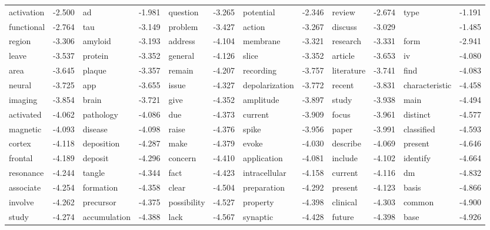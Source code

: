 \documentclass{article}
\begin{document}
\begin{table}
{\begin{tabular}{|l r|l r|l r|l r|l r|l r|}
\hline
activation & -2.500 & ad & -1.981 & question & -3.265 & potential & -2.346 & review & -2.674 & type & -1.191\\
functional & -2.764 & tau & -3.149 & problem & -3.427 & action & -3.267 & discuss & -3.029 &  & -1.485\\
region & -3.306 & amyloid & -3.193 & address & -4.104 & membrane & -3.321 & research & -3.331 & form & -2.941\\
leave & -3.537 & protein & -3.352 & general & -4.126 & slice & -3.352 & article & -3.653 & iv & -4.080\\
area & -3.645 & plaque & -3.357 & remain & -4.207 & recording & -3.757 & literature & -3.741 & find & -4.083\\
neural & -3.725 & app & -3.655 & issue & -4.327 & depolarization & -3.772 & recent & -3.831 & characteristic & -4.458\\
imaging & -3.854 & brain & -3.721 & give & -4.352 & amplitude & -3.897 & study & -3.938 & main & -4.494\\
activated & -4.062 & pathology & -4.086 & due & -4.373 & current & -3.909 & focus & -3.961 & distinct & -4.577\\
magnetic & -4.093 & disease & -4.098 & raise & -4.376 & spike & -3.956 & paper & -3.991 & classified & -4.593\\
cortex & -4.118 & deposition & -4.287 & make & -4.379 & evoke & -4.030 & describe & -4.069 & present & -4.646\\
frontal & -4.189 & deposit & -4.296 & concern & -4.410 & application & -4.081 & include & -4.102 & identify & -4.664\\
resonance & -4.244 & tangle & -4.344 & fact & -4.423 & intracellular & -4.158 & current & -4.116 & dm & -4.832\\
associate & -4.254 & formation & -4.358 & clear & -4.504 & preparation & -4.292 & present & -4.123 & basis & -4.866\\
involve & -4.262 & precursor & -4.375 & possibility & -4.527 & property & -4.398 & clinical & -4.303 & common & -4.900\\
study & -4.274 & accumulation & -4.388 & lack & -4.567 & synaptic & -4.428 & future & -4.398 & base & -4.926\\
\hline
\end{tabular}
}
\end{table}
\end{document}
